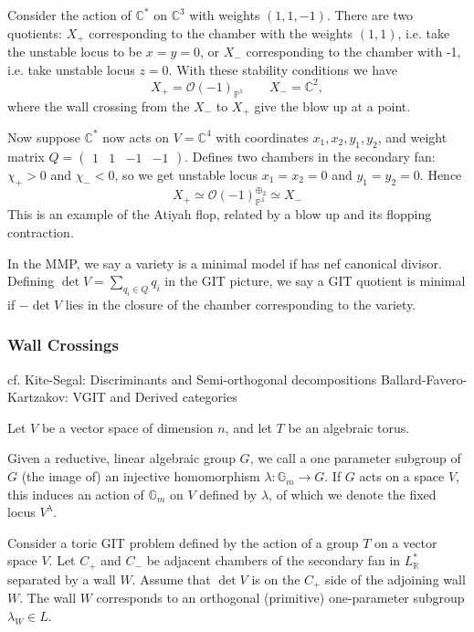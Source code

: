 \begin{example}{}{}
Consider the action of $\mathbb{C}^{*}$ on $\mathbb{C}^3$ with weights $(1,1,-1)$. 
There are two quotients: $X_+$ corresponding to the chamber with the weights $(1,1)$, i.e. take the unstable locus to be $x=y= 0$, or $X_-$ corresponding to the chamber with -1, i.e. take unstable locus $z = 0$. With these stability conditions we have $$
X_{+}= \mathcal{O}(-1)_{\mathbb{P}^{1}} \qquad X_{-}= \mathbb{C}^2, $$ where the wall crossing from the $X_-$ to $X_+$ give the blow up at a point. 

Now suppose $\mathbb{C}^*$ now acts on $V = \mathbb{C}^4$  with coordinates $x_{1}, x_{2}, y_{1},y_{2}$, and weight matrix $Q = \begin{pmatrix}1&1&-1&-1\end{pmatrix}$. 
Defines two chambers in the secondary fan: $\chi_{+}>0$ and $\chi_{-}<0$, so we get unstable locus $x_{1}= x_{2}= 0$ and $y_{1}= y_{2}=0$. Hence $$
X_{+}\simeq \mathcal{O}(-1)_{\mathbb{P}^{1}}^{\oplus_{2}}\simeq X_-
$$This is an example of the Atiyah flop, related by a blow up and its flopping contraction. 
\end{example}


In the MMP, we say a variety is a minimal model if has nef canonical divisor. Defining $\det V = \sum_{q_{i}\in Q}q_i$ in the GIT picture, we  say a GIT quotient is minimal if $-\det V$ lies in the closure of the chamber corresponding to the variety. 

\subsubsection{Wall Crossings}

cf. 
Kite-Segal: Discriminants and Semi-orthogonal decompositions
Ballard-Favero-Kartzakov: VGIT and Derived categories

Let $V$ be a vector space of dimension $n$, and let $T$ be an algebraic torus.

\begin{definition}{}{}
    Given a reductive, linear algebraic group $G$, we call a one parameter subgroup of $G$ (the image of) an injective homomorphism $\lambda : \mathbb{G}_{m}\to G$. If $G$ acts on a space $V$, this induces an action of $\mathbb{G}_m$ on $V$ defined by $\lambda$, of which we denote the fixed locus $V^\lambda$. 
\end{definition}

Consider a toric GIT problem defined by the action of a group $T$ on a vector space $V$. Let $C_+$ and $C_-$ be adjacent chambers of the secondary fan in $L^{*}_\mathbb{R}$ separated by a wall $W$. Assume that $\det V$ is on the $C_{+}$ side of the adjoining wall $W$. The wall $W$ corresponds to an orthogonal (primitive) one-parameter subgroup $\lambda_{W}\in L$.

